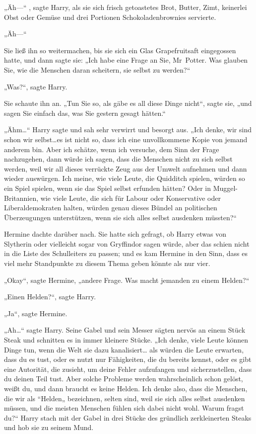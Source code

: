 {„Äh—“ , sagte Harry, als sie sich frisch getoastetes Brot, Butter, Zimt, keinerlei Obst oder Gemüse und drei Portionen Schokoladenbrownies servierte.

„Äh—“

Sie ließ ihn so weitermachen, bis sie sich ein Glas Grapefruitsaft eingegossen hatte, und dann sagte sie: „Ich habe eine Frage an Sie, Mr~Potter. Was glauben Sie, wie die Menschen daran scheitern, sie selbst zu werden?“

„Was?“, sagte Harry.

Sie schaute ihn an. „Tun Sie so, als gäbe es all diese Dinge nicht“, sagte sie, „und sagen Sie einfach das, was Sie gestern gesagt hätten.“

„Ähm…“ Harry sagte und sah sehr verwirrt und besorgt aus. „Ich denke, wir sind schon wir selbst…es ist nicht so, dass ich eine unvollkommene Kopie von jemand anderem bin. Aber ich schätze, wenn ich versuche, dem Sinn der Frage nachzugehen, dann würde ich sagen, dass die Menschen nicht zu sich selbst werden, weil wir all dieses verrückte Zeug aus der Umwelt aufnehmen und dann wieder auswürgen. Ich meine, wie viele Leute, die Quidditch spielen, würden so ein Spiel spielen, wenn sie das Spiel selbst erfunden hätten? Oder in Muggel-Britannien, wie viele Leute, die sich für Labour oder Konservative oder Liberaldemokraten halten, würden genau dieses Bündel an politischen Überzeugungen unterstützen, wenn sie sich alles selbst ausdenken müssten?“

Hermine dachte darüber nach. Sie hatte sich gefragt, ob Harry etwas von Slytherin oder vielleicht sogar von Gryffindor sagen würde, aber das schien nicht in die Liste des Schulleiters zu passen; und es kam Hermine in den Sinn, dass es viel mehr Standpunkte zu diesem Thema geben könnte als nur vier.

„Okay“, sagte Hermine, „andere Frage. Was macht jemanden zu einem Helden?“

„Einen Helden?“, sagte Harry.

„Ja“, sagte Hermine.

„Ah…“ sagte Harry. Seine Gabel und sein Messer sägten nervös an einem Stück Steak und schnitten es in immer kleinere Stücke. „Ich denke, viele Leute können Dinge tun, wenn die Welt sie dazu kanalisiert… als würden die Leute erwarten, dass du es tust, oder es nutzt nur Fähigkeiten, die du bereits kennst, oder es gibt eine Autorität, die zusieht, um deine Fehler aufzufangen und sicherzustellen, dass du deinen Teil tust. Aber solche Probleme werden wahrscheinlich schon gelöst, weißt du, und dann braucht es keine Helden. Ich denke also, dass die Menschen, die wir als “Helden„ bezeichnen, selten sind, weil sie sich alles selbst ausdenken müssen, und die meisten Menschen fühlen sich dabei nicht wohl. Warum fragst du?“ Harry stach mit der Gabel in drei Stücke des gründlich zerkleinerten Steaks und hob sie zu seinem Mund.

}

